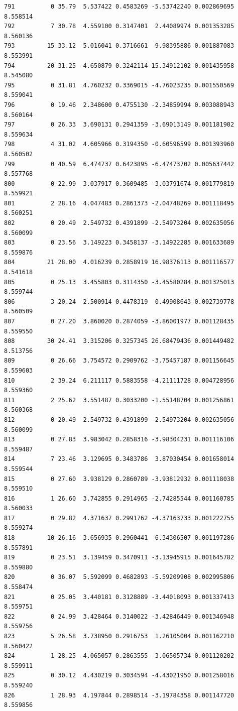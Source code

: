 \documentclass[]{book}
\theoremstyle{definition}
\theoremstyle{definition}
\theoremstyle{definition}
\theoremstyle{remark}
\begin{document}
\begin{verbatim}
791          0 35.79  5.537422 0.4583269 -5.53742240 0.002869695 8.558514
792          7 30.78  4.559100 0.3147401  2.44089974 0.001353285 8.560136
793         15 33.12  5.016041 0.3716661  9.98395886 0.001887083 8.553991
794         20 31.25  4.650879 0.3242114 15.34912102 0.001435958 8.545080
795          0 31.81  4.760232 0.3369015 -4.76023235 0.001550569 8.559041
796          0 19.46  2.348600 0.4755130 -2.34859994 0.003088943 8.560164
797          0 26.33  3.690131 0.2941359 -3.69013149 0.001181902 8.559634
798          4 31.02  4.605966 0.3194350 -0.60596599 0.001393960 8.560502
799          0 40.59  6.474737 0.6423895 -6.47473702 0.005637442 8.557768
800          0 22.99  3.037917 0.3609485 -3.03791674 0.001779819 8.559921
801          2 28.16  4.047483 0.2861373 -2.04748269 0.001118495 8.560251
802          0 20.49  2.549732 0.4391899 -2.54973204 0.002635056 8.560099
803          0 23.56  3.149223 0.3458137 -3.14922285 0.001633689 8.559876
804         21 28.00  4.016239 0.2858919 16.98376113 0.001116577 8.541618
805          0 25.13  3.455803 0.3114350 -3.45580284 0.001325013 8.559744
806          3 20.24  2.500914 0.4478319  0.49908643 0.002739778 8.560509
807          0 27.20  3.860020 0.2874059 -3.86001977 0.001128435 8.559550
808         30 24.41  3.315206 0.3257345 26.68479436 0.001449482 8.513756
809          0 26.66  3.754572 0.2909762 -3.75457187 0.001156645 8.559603
810          2 39.24  6.211117 0.5883558 -4.21111728 0.004728956 8.559360
811          2 25.62  3.551487 0.3033200 -1.55148704 0.001256861 8.560368
812          0 20.49  2.549732 0.4391899 -2.54973204 0.002635056 8.560099
813          0 27.83  3.983042 0.2858316 -3.98304231 0.001116106 8.559487
814          7 23.46  3.129695 0.3483786  3.87030454 0.001658014 8.559544
815          0 27.60  3.938129 0.2860789 -3.93812932 0.001118038 8.559510
816          1 26.60  3.742855 0.2914965 -2.74285544 0.001160785 8.560033
817          0 29.82  4.371637 0.2991762 -4.37163733 0.001222755 8.559274
818         10 26.16  3.656935 0.2960441  6.34306507 0.001197286 8.557891
819          0 23.51  3.139459 0.3470911 -3.13945915 0.001645782 8.559880
820          0 36.07  5.592099 0.4682893 -5.59209908 0.002995806 8.558474
821          0 25.05  3.440181 0.3128889 -3.44018093 0.001337413 8.559751
822          0 24.99  3.428464 0.3140022 -3.42846449 0.001346948 8.559756
823          5 26.58  3.738950 0.2916753  1.26105004 0.001162210 8.560422
824          1 28.25  4.065057 0.2863555 -3.06505734 0.001120202 8.559911
825          0 30.12  4.430219 0.3034594 -4.43021950 0.001258016 8.559240
826          1 28.93  4.197844 0.2898514 -3.19784358 0.001147720 8.559856

\end{verbatim}
\end{document}
